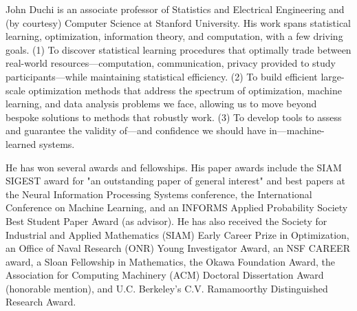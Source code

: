 John Duchi is an associate professor of Statistics and Electrical Engineering and (by courtesy) Computer Science at Stanford University. His work spans statistical learning, optimization, information theory, and computation, with a few driving goals. (1) To discover statistical learning procedures that optimally trade between real-world resources---computation, communication, privacy provided to study participants---while maintaining statistical efficiency. (2) To build efficient large-scale optimization methods that address the spectrum of optimization, machine learning, and data analysis problems we face, allowing us to move beyond bespoke solutions to methods that robustly work. (3) To develop tools to assess and guarantee the validity of---and confidence we should have in---machine-learned systems.

He has won several awards and fellowships. His paper awards include the SIAM SIGEST award for "an outstanding paper of general interest" and best papers at the Neural Information Processing Systems conference, the International Conference on Machine Learning, and an INFORMS Applied Probability Society Best Student Paper Award (as advisor). He has also received the Society for Industrial and Applied Mathematics (SIAM) Early Career Prize in Optimization, an Office of Naval Research (ONR) Young Investigator Award, an NSF CAREER award, a Sloan Fellowship in Mathematics, the Okawa Foundation Award, the Association for Computing Machinery (ACM) Doctoral Dissertation Award (honorable mention), and U.C. Berkeley's C.V. Ramamoorthy Distinguished Research Award.
